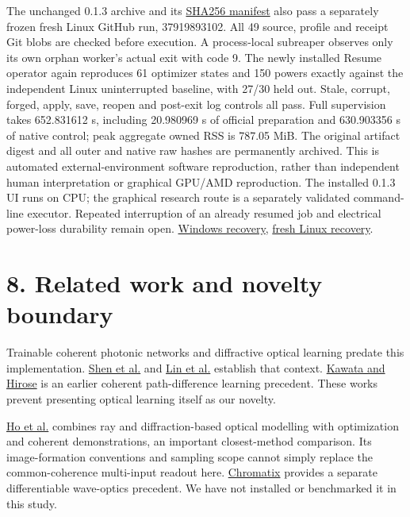 \documentclass[11pt]{article}
\begin{document}
The unchanged 0.1.3 archive and its \href{https://github.com/Agnuxo1/Neuro3D/blob/a6d0fbec5011bdc76abad71edac86519016348f4/Blender/releases/optic-neuro-blender-0.1.3.manifest.json}{SHA256 manifest} also pass a separately frozen fresh Linux GitHub run, 37919893102. All 49 source, profile and receipt Git blobs are checked before execution. A process-local subreaper observes only its own orphan worker's actual exit with code 9. The newly installed Resume operator again reproduces 61 optimizer states and 150 powers exactly against the independent Linux uninterrupted baseline, with 27/30 held out. Stale, corrupt, forged, apply, save, reopen and post-exit log controls all pass. Full supervision takes 652.831612 s, including 20.980969 s of official preparation and 630.903356 s of native control; peak aggregate owned RSS is 787.05 MiB. The original artifact digest and all outer and native raw hashes are permanently archived. This is automated external-environment software reproduction, rather than independent human interpretation or graphical GPU/AMD reproduction. The installed 0.1.3 UI runs on CPU; the graphical research route is a separately validated command-line executor. Repeated interruption of an already resumed job and electrical power-loss durability remain open. \href{https://github.com/Agnuxo1/Neuro3D/blob/a6d0fbec5011bdc76abad71edac86519016348f4/Docs/INSTALLED\_BLENDER\_HOST\_RECOVERY\_PROTOCOL\_2026-10-09.md}{Windows recovery}, \href{https://github.com/Agnuxo1/Neuro3D/blob/a6d0fbec5011bdc76abad71edac86519016348f4/Docs/EXTERNAL\_INSTALLED\_BLENDER\_RECOVERY\_PROTOCOL\_2026-10-09.md}{fresh Linux recovery}.

\section*{8. Related work and novelty boundary}

Trainable coherent photonic networks and diffractive optical learning predate this implementation. \href{https://arxiv.org/abs/1610.02365}{Shen et al.} and \href{https://arxiv.org/abs/1804.08711}{Lin et al.} establish that context. \href{https://doi.org/10.1364/OL.28.002524}{Kawata and Hirose} is an earlier coherent path-difference learning precedent. These works prevent presenting optical learning itself as our novelty.

\href{https://arxiv.org/html/2412.09774v2}{Ho et al.} combines ray and diffraction-based optical modelling with optimization and coherent demonstrations, an important closest-method comparison. Its image-formation conventions and sampling scope cannot simply replace the common-coherence multi-input readout here. \href{https://github.com/chromatix-team/chromatix}{Chromatix} provides a separate differentiable wave-optics precedent. We have not installed or benchmarked it in this study.
\end{document}

